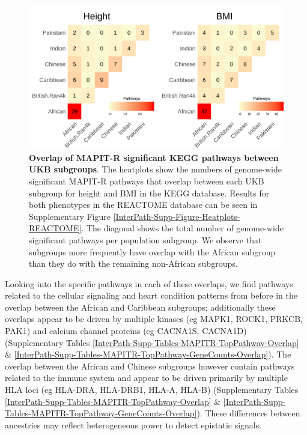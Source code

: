 \documentclass[12pt,a4paper]{article}
\begin{document}
\begin{figure}[htb]
\centering
\includegraphics[scale=.225]{Images/Main/InterPath_Main_Figure_Heatplots_KEGG_vs2.png}
\caption[TBD]{\textbf{Overlap of MAPIT-R significant KEGG pathways between UKB subgroups}. The heatplots show the numbers of genome-wide significant MAPIT-R pathways that overlap between each UKB subgroup for height and BMI in the KEGG database. Results for both phenotypes in the REACTOME database can be seen in Supplementary Figure \ref{InterPath-Supp-Figure-Heatplots-REACTOME}. The diagonal shows the total number of genome-wide significant pathways per population subgroup. We observe that subgroups more frequently have overlap with the African subgroup than they do with the remaining non-African subgroups.}
\label{InterPath-Main-Figure-Heatplots-KEGG}
\end{figure}

Looking into the specific pathways in each of these overlaps, we find pathways related to the cellular signaling and heart condition patterns from before in the overlap between the African and Caribbean subgroups; additionally these overlaps appear to be driven by multiple kinases (eg MAPK1, ROCK1, PRKCB, PAK1) and calcium channel proteins (eg CACNA1S, CACNA1D) (Supplementary Tables \ref{InterPath-Supp-Tables-MAPITR-TopPathway-Overlap} \& \ref{InterPath-Supp-Tables-MAPITR-TopPathway-GeneCounts-Overlap}). The overlap between the African and Chinese subgroups however contain pathways related to the immune system and appear to be driven primarily by multiple HLA loci (eg HLA-DRA, HLA-DRB1, HLA-A, HLA-B) (Supplementary Tables \ref{InterPath-Supp-Tables-MAPITR-TopPathway-Overlap} \& \ref{InterPath-Supp-Tables-MAPITR-TopPathway-GeneCounts-Overlap}). These differences between ancestries may reflect heterogeneous power to detect epistatic signals. 
\end{document}
